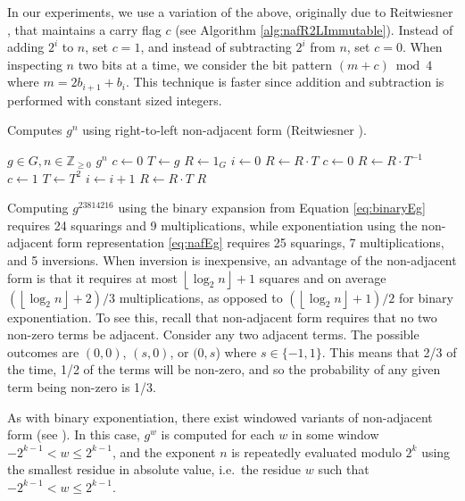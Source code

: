 \documentclass{ucalgthes1}
\theoremstyle{definition}
\newcommand{\ZZgez}{\mathbb{Z}_{\ge 0}}
\newcommand{\floor}[1]{\left\lfloor #1 \right\rfloor}
\begin{document}
In our experiments, we use a variation of the above, originally due to Reitwiesner \cite{reitwiesner1960}, that maintains a carry flag $c$ (see Algorithm \ref{alg:nafR2LImmutable}).  Instead of adding $2^i$ to $n$, set $c = 1$, and instead of subtracting $2^i$ from $n$, set $c = 0$.  When inspecting $n$ two bits at a time, we consider the bit pattern $(m+c) \bmod 4$ where $m = 2 b_{i+1} + b_i$.  This technique is faster since addition and subtraction is performed with constant sized integers.

\begin{algorithm}[htb]
\caption{Computes $g^n$ using right-to-left non-adjacent form (Reitwiesner \cite{reitwiesner1960}).}
\label{alg:nafR2LImmutable}
\begin{algorithmic}[1]
\Require $g \in G, n \in \ZZgez$
\Ensure $g^n$
\State $c \gets 0$ 
\State $T \gets g$ 
\State $R \gets 1_G$
\State $i \gets 0$
	\If {$\floor{n/2^i}+c \equiv 1 \pmod 4$}
		\State $R \gets R \cdot T$
		\State $c \gets 0$
	\ElsIf {$\floor{n/2^i}+c \equiv 3 \pmod 4$}
		\State $R \gets R \cdot T^{-1}$
		\State $c \gets 1$
	\EndIf
	\State $T \gets T^2$
	\State $i \gets i+1$
\EndWhile
{} \State $R \gets R \cdot T$ \EndIf
\State \Return $R$
\end{algorithmic}
\end{algorithm}

Computing $g^{23814216}$ using the binary expansion from Equation \eqref{eq:binaryEg} requires 24 squarings and 9 multiplications, while exponentiation using the non-adjacent form representation \eqref{eq:nafEg} requires 25 squarings, 7 multiplications, and 5 inversions.  When inversion is inexpensive, an advantage of the non-adjacent form is that it requires at most $\floor{\log_2 n}+1$ squares and on average $(\floor{\log_2 n}+2)/3$ multiplications, as opposed to $(\floor{\log_2 n}+1)/2$ for binary exponentiation.  To see this, recall that non-adjacent form requires that no two non-zero terms be adjacent.  Consider any two adjacent terms.  The possible outcomes are $(0,0)$, $(s, 0)$, or $(0, s$) where $s \in \{-1, 1\}$. This means that 2/3 of the time, 1/2 of the terms will be non-zero, and so the probability of any given term being non-zero is 1/3.

As with binary exponentiation, there exist windowed variants of non-adjacent form (see \cite[Algorithm~9.20.~p.153]{Cohen2006}).   In this case, $g^w$ is computed for each $w$ in some window $-2^{k-1} < w \le 2^{k-1}$, and the exponent $n$ is repeatedly evaluated modulo $2^k$ using the smallest residue in absolute value, i.e.\ the residue $w$ such that $-2^{k-1} < w \le 2^{k-1}$.
\end{document}
